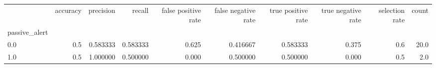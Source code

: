\begin{tabular}{lrrrrrrrrr}
\toprule
{} &  accuracy &  precision &    recall &  false positive rate &  false negative rate &  true positive rate &  true negative rate &  selection rate &  count \\
passive\_alert &           &            &           &                      &                      &                     &                     &                 &        \\
\midrule
0.0           &       0.5 &   0.583333 &  0.583333 &                0.625 &             0.416667 &            0.583333 &               0.375 &             0.6 &   20.0 \\
1.0           &       0.5 &   1.000000 &  0.500000 &                0.000 &             0.500000 &            0.500000 &               0.000 &             0.5 &    2.0 \\
\bottomrule
\end{tabular}
